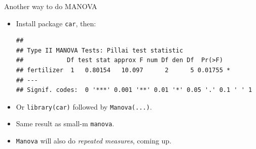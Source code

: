 \begin{frame}[fragile]{Another way to do MANOVA}

  
  \begin{itemize}
  \item Install package \texttt{car}, then:
  
{\small
 
\begin{knitrout}
\color{fgcolor}\begin{kframe}
\begin{alltt}
\hlkwb{=}\hlopt{~}
\hlkwb{=}\hlopt{::}
\end{alltt}
\begin{verbatim}
## 
## Type II MANOVA Tests: Pillai test statistic
##            Df test stat approx F num Df den Df  Pr(>F)  
## fertilizer  1   0.80154   10.097      2      5 0.01755 *
## ---
## Signif. codes:  0 '***' 0.001 '**' 0.01 '*' 0.05 '.' 0.1 ' ' 1
\end{verbatim}
\end{kframe}
\end{knitrout}

}

  
\item Or \texttt{library(car)} followed by \texttt{Manova(...)}.
\item Same result as small-m \texttt{manova}.
\item \texttt{Manova} will also do \emph{repeated measures}, coming up.
\end{itemize}
  
\end{frame}

